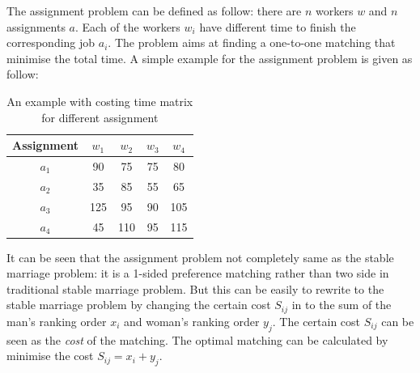 \documentclass[14pt]{extarticle}
\begin{document}
The assignment problem can be defined as follow: there are $n$ workers $w$ and $n$ assignments $a$.
Each of the workers $w_i$ have different time to finish the corresponding job $a_i$.
The problem aims at finding a one-to-one matching that minimise the total time.
A simple example for the assignment problem is given as follow:
\begin{table}[H]
  \centering
  \begin{tabular}{|c|c|c|c|c|}
    \hline
    Assignment & $w_1$ & $w_2$ & $w_3$ & $w_4$ \\
    \hline
    \hline
    $a_1$ & 90 & 75 & 75 & 80 \\
    \hline
    $a_2$ & 35 & 85 & 55 & 65 \\
    \hline
    $a_3$ & 125 & 95 & 90 & 105 \\
    \hline
    $a_4$ & 45 & 110 & 95 & 115 \\
    \hline
  \end{tabular}
  \caption{An example with costing time matrix for different assignment}
\end{table}

It can be seen that the assignment problem not completely same as the stable marriage problem: it is a 1-sided preference matching rather than two side in traditional stable marriage problem.
But this can be easily to rewrite to the stable marriage problem by changing the certain cost $S_{ij}$ in to the sum of the man's ranking order $x_i$ and woman's ranking order $y_j$.
The certain cost $S_{ij}$ can be seen as the {\it cost} of the matching. The optimal matching can be calculated by minimise the cost $S_{ij} = x_i + y_j$.
\end{document}

